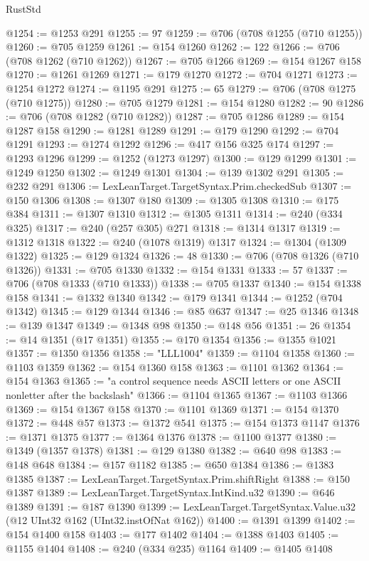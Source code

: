 \begin{lexlean}{RustStd}
\begin{coremodule}
@1254 := @1253 @291
@1255 := 97
@1259 := @706 (@708 @1255 (@710 @1255))
@1260 := @705 @1259
@1261 := @154 @1260
@1262 := 122
@1266 := @706 (@708 @1262 (@710 @1262))
@1267 := @705 @1266
@1269 := @154 @1267 @158
@1270 := @1261 @1269
@1271 := @179 @1270
@1272 := @704 @1271
@1273 := @1254 @1272
@1274 := @1195 @291
@1275 := 65
@1279 := @706 (@708 @1275 (@710 @1275))
@1280 := @705 @1279
@1281 := @154 @1280
@1282 := 90
@1286 := @706 (@708 @1282 (@710 @1282))
@1287 := @705 @1286
@1289 := @154 @1287 @158
@1290 := @1281 @1289
@1291 := @179 @1290
@1292 := @704 @1291
@1293 := @1274 @1292
@1296 := @417 @156 @325 @174
@1297 := @1293 @1296
@1299 := @1252 (@1273 @1297)
@1300 := @129 @1299
@1301 := @1249 @1250
@1302 := @1249 @1301
@1304 := @139 @1302 @291
@1305 := @232 @291
@1306 := LexLeanTarget.TargetSyntax.Prim.checkedSub
@1307 := @150 @1306
@1308 := @1307 @180
@1309 := @1305 @1308
@1310 := @175 @384
@1311 := @1307 @1310
@1312 := @1305 @1311
@1314 := @240 (@334 @325)
@1317 := @240 (@257 @305) @271
@1318 := @1314 @1317
@1319 := @1312 @1318
@1322 := @240 (@1078 @1319) @1317
@1324 := @1304 (@1309 @1322)
@1325 := @129 @1324
@1326 := 48
@1330 := @706 (@708 @1326 (@710 @1326))
@1331 := @705 @1330
@1332 := @154 @1331
@1333 := 57
@1337 := @706 (@708 @1333 (@710 @1333))
@1338 := @705 @1337
@1340 := @154 @1338 @158
@1341 := @1332 @1340
@1342 := @179 @1341
@1344 := @1252 (@704 @1342)
@1345 := @129 @1344
@1346 := @85 @637
@1347 := @25 @1346
@1348 := @139 @1347
@1349 := @1348 @98
@1350 := @148 @56
@1351 := 26
@1354 := @14 @1351 (@17 @1351)
@1355 := @170 @1354
@1356 := @1355 @1021
@1357 := @1350 @1356
@1358 := "LLL1004"
@1359 := @1104 @1358
@1360 := @1103 @1359
@1362 := @154 @1360 @158
@1363 := @1101 @1362
@1364 := @154 @1363
@1365 := "a control sequence needs ASCII letters or one ASCII nonletter after the backslash"
@1366 := @1104 @1365
@1367 := @1103 @1366
@1369 := @154 @1367 @158
@1370 := @1101 @1369
@1371 := @154 @1370
@1372 := @448 @57
@1373 := @1372 @541
@1375 := @154 @1373 @1147
@1376 := @1371 @1375
@1377 := @1364 @1376
@1378 := @1100 @1377
@1380 := @1349 (@1357 @1378)
@1381 := @129 @1380
@1382 := @640 @98
@1383 := @148 @648
@1384 := @157 @1182
@1385 := @650 @1384
@1386 := @1383 @1385
@1387 := LexLeanTarget.TargetSyntax.Prim.shiftRight
@1388 := @150 @1387
@1389 := LexLeanTarget.TargetSyntax.IntKind.u32
@1390 := @646 @1389
@1391 := @187 @1390
@1399 := LexLeanTarget.TargetSyntax.Value.u32 (@12 UInt32 @162 (UInt32.instOfNat @162))
@1400 := @1391 @1399
@1402 := @154 @1400 @158
@1403 := @177 @1402
@1404 := @1388 @1403
@1405 := @1155 @1404
@1408 := @240 (@334 @235) @1164
@1409 := @1405 @1408

\end{coremodule}
\end{lexlean}
